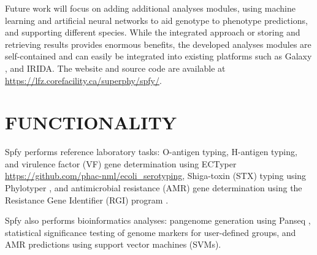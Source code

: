 \documentclass[a4,center,fleqn]{NAR}
\begin{document}
Future work will focus on adding additional analyses modules, using machine learning and artificial neural networks to aid genotype to phenotype predictions, and supporting different species. While the integrated approach or storing and retrieving results provides enormous benefits, the developed analyses modules are self-contained and can easily be integrated into existing platforms such as Galaxy \cite{goecks2010galaxy}, and IRIDA. The website and source code are available at \url{https://lfz.corefacility.ca/superphy/spfy/}.



\enlargethispage{-65.1pt}



\section{FUNCTIONALITY}
Spfy performs reference laboratory tasks: O-antigen typing, H-antigen typing, and virulence factor (VF) gene determination using ECTyper \url{https://github.com/phac-nml/ecoli_serotyping}, Shiga-toxin (STX) typing using Phylotyper \cite{whiteside2017phylotyper}, and antimicrobial resistance (AMR) gene determination using the Resistance Gene Identifier (RGI) program \cite{mcarthur2013comprehensive}.

Spfy also performs bioinformatics analyses: pangenome generation using Panseq \cite{laing2010pan}, statistical significance testing of genome markers for user-defined groups, and AMR predictions using support vector machines (SVMs).
\end{document}
